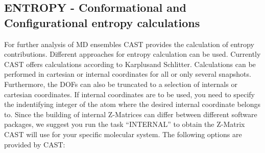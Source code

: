 \documentclass[10pt,a4paper]{article} %
\begin{document}
	\subsection{ENTROPY - Conformational and Configurational entropy calculations}
	For further analysis of \acl{MD} ensembles \ac{CAST} provides the calculation of entropy contributions. Different approaches for entropy calculation can be used. Currently \ac{CAST} offers calculations according to Karplus\supercite{karplus_entropy}and Schlitter\supercite{schlitter_entropy}. Calculations can be performed in cartesian or internal coordinates for all or only several snapshots. Furthermore, the \acp{DOF} can also be truncated to a selection of internals or cartesian coordinates. If internal coordinates are to be used, you need to specify the indentifying integer of the atom where the desired internal coordinate belongs to. Since the building of internal Z-Matrices can differ between different software packages, we suggest you run the task ``INTERNAL'' to obtain the Z-Matrix \ac{CAST} will use for your specific molecular system. The following options are provided by \ac{CAST}: \\~\\
	
\end{document}
